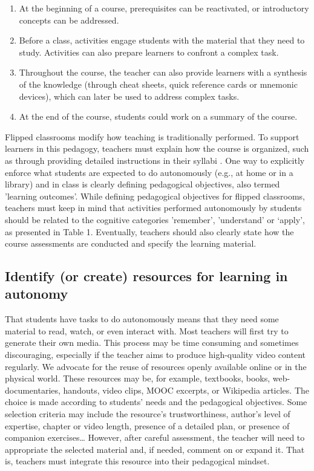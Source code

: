 \documentclass[10pt,letterpaper]{article}
\begin{document}
\begin{enumerate}

\item At the beginning of a course, prerequisites can be reactivated, or introductory concepts can be addressed.

\item Before a class, activities engage students with the material that they need to study. 
Activities can also prepare learners to confront a complex task.

\item Throughout the course, the teacher can also provide learners with a synthesis of the knowledge (through cheat sheets, quick reference cards or mnemonic devices), which can later be used to address complex tasks.

\item At the end of the course, students could work on a summary of the course.

\end{enumerate}

Flipped classrooms modify how teaching is traditionally performed. To support learners in this pedagogy, teachers must explain how the course is organized, such as through providing detailed instructions in their syllabi \cite{grunert_obrien_course_2008}. One way to explicitly enforce what students are expected to do autonomously (e.g., at home or in a library) and in class is clearly defining pedagogical objectives, also termed 'learning outcomes'. 
While defining pedagogical objectives for flipped classrooms, teachers must keep in mind 
that activities performed autonomously by students should be related to the cognitive categories 'remember', 'understand' or `apply', as presented in Table 1. Eventually, teachers should also clearly state how the course assessments are conducted and specify the learning material.


\subsection{Identify (or create) resources for learning in autonomy}

That students have tasks to do autonomously means that they need some material to read, watch, or even interact with. 
Most teachers will first try to generate their own media. This process may be time consuming and sometimes discouraging, especially if the teacher aims to produce high-quality video content regularly. We advocate for the reuse of resources 
openly available online or in the physical world. These resources may be, for example, textbooks, books, web-documentaries, handouts, video clips, MOOC excerpts, or Wikipedia articles. The choice is made according to students' needs and the pedagogical objectives. 
Some selection criteria may include the resource’s trustworthiness, author's level of expertise, chapter or video length, presence of a detailed plan, or presence of companion exercises\ldots{} However, after careful assessment, the teacher will need to appropriate the selected material and, if needed, comment on or expand it. That is, teachers must integrate this resource into their pedagogical mindset.
\end{document}
